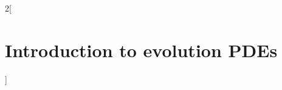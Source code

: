 \documentclass[../../../main_math.tex]{subfiles}
\begin{document}
\begin{multicols}{2}[\section{Introduction to evolution PDEs}]

\end{multicols}
\end{document}
